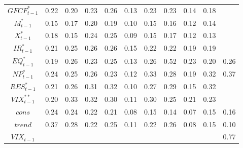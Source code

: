 \documentclass[a4paper, twoside]{templates/ociamthesis}
\begin{document}
\begin{table}[!ht]
\begin{tabular}[t]{ccccccccccc}
$GFCF^*_{t-1}$ & 0.22 & 0.20 & 0.23 & 0.26 & 0.13 & 0.23 & 0.23 & 0.14 & 0.18 & \\
$M^*_{t-1}$ & 0.15 & 0.17 & 0.20 & 0.19 & 0.10 & 0.15 & 0.16 & 0.12 & 0.14 & \\
$X^*_{t-1}$ & 0.18 & 0.15 & 0.24 & 0.25 & 0.09 & 0.15 & 0.17 & 0.12 & 0.13 & \\
$IR^*_{t-1}$ & 0.21 & 0.25 & 0.26 & 0.26 & 0.15 & 0.22 & 0.22 & 0.19 & 0.19 & \\
$EQ^*_{t-1}$ & 0.19 & 0.26 & 0.23 & 0.25 & 0.13 & 0.26 & 0.52 & 0.23 & 0.20 & 0.26\\
$NP^*_{t-1}$ & 0.24 & 0.25 & 0.26 & 0.23 & 0.12 & 0.33 & 0.28 & 0.19 & 0.32 & 0.37\\
$RES^*_{t-1}$ & 0.21 & 0.26 & 0.31 & 0.32 & 0.10 & 0.27 & 0.29 & 0.15 & 0.32 & \\
$VIX^{**}_{t-1}$ & 0.20 & 0.33 & 0.32 & 0.30 & 0.11 & 0.30 & 0.25 & 0.21 & 0.23 & \\
$cons$ & 0.24 & 0.24 & 0.22 & 0.21 & 0.08 & 0.15 & 0.14 & 0.07 & 0.15 & 0.16\\
$trend$ & 0.37 & 0.28 & 0.22 & 0.25 & 0.11 & 0.22 & 0.26 & 0.08 & 0.15 & 0.10\\
$VIX_{t-1}$ &  &  &  &  &  &  &  &  &  & 0.77\\
\bottomrule
\end{tabular}
\end{table}

\clearpage
\end{document}
